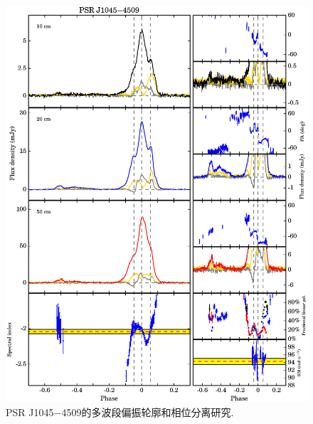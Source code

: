 \begin{figure}
\begin{center}
\includegraphics[width=6 in]{1045.ps}
\caption{PSR J1045$-$4509的多波段偏振轮廓和相位分离研究.}
\label{1045}
\end{center}
\end{figure}


